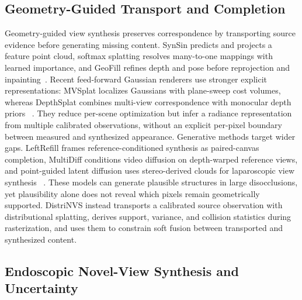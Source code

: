 \documentclass[letterpaper,10pt,conference]{ieeeconf}
\begin{document}
\subsection{Geometry-Guided Transport and Completion}

Geometry-guided view synthesis preserves correspondence by transporting source
evidence before generating missing content. SynSin predicts and projects a
feature point cloud, softmax splatting resolves many-to-one mappings with
learned importance, and GeoFill refines depth and pose before reprojection and
inpainting~\cite{wiles2020synsin,niklaus2020softmax,zhao2023geofill}. Recent
feed-forward Gaussian renderers use stronger explicit representations: MVSplat
localizes Gaussians with plane-sweep cost volumes, whereas DepthSplat combines
multi-view correspondence with monocular depth priors
~\cite{chen2024mvsplat,xu2025depthsplat}. They reduce per-scene optimization but
infer a radiance representation from multiple calibrated observations, without
an explicit per-pixel boundary between measured and synthesized appearance.
Generative methods target wider gaps. LeftRefill frames reference-conditioned
synthesis as paired-canvas completion, MultiDiff conditions video diffusion on
depth-warped reference views, and point-guided latent diffusion uses
stereo-derived clouds for laparoscopic view synthesis
~\cite{cao2024leftrefill,muller2024multidiff,tang2025pointguided}. These models can
generate plausible structures in large disocclusions, yet plausibility alone
does not reveal which pixels remain geometrically supported. DistriNVS instead
transports a calibrated source observation with distributional splatting,
derives support, variance, and collision statistics during rasterization, and
uses them to constrain soft fusion between transported and synthesized content.

\subsection{Endoscopic Novel-View Synthesis and Uncertainty}
\end{document}
